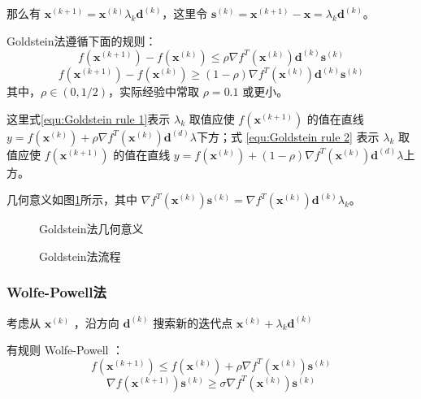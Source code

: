 \documentclass{book}
\begin{document}
那么有 $\boldsymbol{x}^{(k+1)}=\boldsymbol{x}^{(k)}\lambda_k\boldsymbol{d}^{(k)}$，这里令 $\boldsymbol{s}^{(k)}=\boldsymbol{x}^{(k+1)}-\boldsymbol{x}=\lambda_k\boldsymbol{d}^{(k)}$。

Goldstein法遵循下面的规则：
\begin{equation}
    f(\boldsymbol{x}^{(k+1)})-f(\boldsymbol{x}^{(k)})\le\rho\nabla f^T(\boldsymbol{x}^{(k)})\boldsymbol{d}^{(k)}\boldsymbol{s}^{(k)}
    \label{equ:Goldstein rule 1}
\end{equation}
\begin{equation}
    f(\boldsymbol{x}^{(k+1)})-f(\boldsymbol{x}^{(k)})\ge(1-\rho)\nabla f^T(\boldsymbol{x}^{(k)})\boldsymbol{d}^{(k)}\boldsymbol{s}^{(k)}
    \label{equ:Goldstein rule 2}
\end{equation}
其中，$\rho\in(0,1/2)$，实际经验中常取 $\rho=0.1$ 或更小。

这里式\ref{equ:Goldstein rule 1}表示 $\lambda_k$ 取值应使 $f(\boldsymbol{x}^{(k+1)})$ 的值在直线 $y=f(\boldsymbol{x}^{(k)})+\rho\nabla f^T(\boldsymbol{x}^{(k)})\boldsymbol{d}^{(d)}\lambda$下方；式 \ref{equ:Goldstein rule 2} 表示 $\lambda_k$ 取值应使 $f(\boldsymbol{x}^{(k+1)})$ 的值在直线 $y=f(\boldsymbol{x}^{(k)})+(1-\rho)\nabla f^T(\boldsymbol{x}^{(k)})\boldsymbol{d}^{(d)}\lambda$上方。

几何意义如图\ref{fig:Axis of Goldstein method}所示，其中 $\nabla f^T(\boldsymbol{x}^{(k)})\boldsymbol{s}^{(k)}=\nabla f^T(\boldsymbol{x}^{(k)})\boldsymbol{d}^{(k)}\lambda_k$。

\begin{figure}[ht]
    \centering
    
    \caption{Goldstein法几何意义}
    \label{fig:Axis of Goldstein method}
\end{figure}

\begin{figure}[ht]
    \centering
    
    \caption{Goldstein法流程}
    \label{fig:flow of Goldstein method}
\end{figure}

\subsubsection{Wolfe-Powell法}

考虑从 $\boldsymbol{x}^{(k)}$ ，沿方向 $\boldsymbol{d}^{(k)}$ 搜索新的迭代点 $\boldsymbol{x}^{(k)}+\lambda_k\boldsymbol{d}^{(k)}$

有规则 Wolfe-Powell ：
\begin{equation}
    f(\boldsymbol{x}^{(k+1)})\le f(\boldsymbol{x}^{(k)})+\rho\nabla f^T(\boldsymbol{x}^{(k)})\boldsymbol{s}^{(k)}
    \label{equ:Wolfe-Powell rule 1}
\end{equation}
\begin{equation}
    \nabla f(\boldsymbol{x}^{(k+1)})\boldsymbol{s}^{(k)}\ge\sigma\nabla f^T(\boldsymbol{x}^{(k)})\boldsymbol{s}^{(k)}
    \label{equ:Wolfe-Powell rule 2}
\end{equation}
\end{document}
